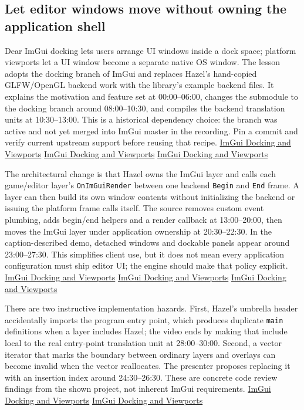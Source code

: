 \subsection{Let editor windows move without owning the application shell}\label{06-engine-ii-ch032-let-editor-windows-move-without-owning-the-application-shell}

Dear ImGui docking lets users arrange UI windows inside a dock space; platform viewports let a UI window become a separate native OS window. The lesson adopts the docking branch of ImGui and replaces Hazel's hand-copied GLFW/OpenGL backend work with the library's example backend files. It explains the motivation and feature set at 00:00--06:00, changes the submodule to the docking branch around 08:00--10:30, and compiles the backend translation units at 10:30--13:00. This is a historical dependency choice: the branch was active and not yet merged into ImGui master in the recording. Pin a commit and verify current upstream support before reusing that recipe. \href{https://www.youtube.com/watch?v=lZuje-3iyVE&t=0s}{ImGui Docking and Viewports} \href{https://www.youtube.com/watch?v=lZuje-3iyVE&t=480s}{ImGui Docking and Viewports} \href{https://www.youtube.com/watch?v=lZuje-3iyVE&t=630s}{ImGui Docking and Viewports}

The architectural change is that Hazel owns the ImGui layer and calls each game/editor layer's \texttt{OnImGuiRender} between one backend \texttt{Begin} and \texttt{End} frame. A layer can then build its own window contents without initializing the backend or issuing the platform frame calls itself. The source removes custom event plumbing, adds begin/end helpers and a render callback at 13:00--20:00, then moves the ImGui layer under application ownership at 20:30--22:30. In the caption-described demo, detached windows and dockable panels appear around 23:00--27:30. This simplifies client use, but it does not mean every application configuration must ship editor UI; the engine should make that policy explicit. \href{https://www.youtube.com/watch?v=lZuje-3iyVE&t=780s}{ImGui Docking and Viewports} \href{https://www.youtube.com/watch?v=lZuje-3iyVE&t=1020s}{ImGui Docking and Viewports} \href{https://www.youtube.com/watch?v=lZuje-3iyVE&t=1380s}{ImGui Docking and Viewports}

There are two instructive implementation hazards. First, Hazel's umbrella header accidentally imports the program entry point, which produces duplicate \texttt{main} definitions when a layer includes Hazel; the video ends by making that include local to the real entry-point translation unit at 28:00--30:00. Second, a vector iterator that marks the boundary between ordinary layers and overlays can become invalid when the vector reallocates. The presenter proposes replacing it with an insertion index around 24:30--26:30. These are concrete code review findings from the shown project, not inherent ImGui requirements. \href{https://www.youtube.com/watch?v=lZuje-3iyVE&t=1680s}{ImGui Docking and Viewports} \href{https://www.youtube.com/watch?v=lZuje-3iyVE&t=1470s}{ImGui Docking and Viewports}

